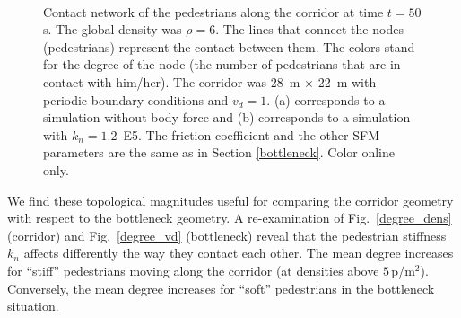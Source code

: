\documentclass[preprint,12pt]{elsarticle}
\begin{document}
\begin{figure}[!htbp]
\centering
    \ 
    \\
\caption[width=0.47\columnwidth]{Contact network of the pedestrians along the corridor at time $t=50\,$s. The global density was $\rho=6$.  The lines that connect the nodes (pedestrians) represent the contact between them. The colors stand for the degree of the node (the number of pedestrians that are in contact with him/her). The corridor was 28~m $\times$ 22~m with periodic boundary conditions and $v_d=1$. (a) corresponds to a simulation without body force and (b) corresponds to a simulation with $k_n=1.2$~E5. The friction coefficient and the other SFM parameters are the same as in Section \ref{bottleneck}. Color online only.}
\label{network_corridor}
\end{figure}

We find these topological magnitudes useful for comparing the 
corridor geometry with respect to the bottleneck geometry. A re-examination of 
Fig.~\ref{degree_dens} (corridor) and Fig.~\ref{degree_vd} (bottleneck) reveal 
that the pedestrian stiffness $k_n$ affects differently the way they contact 
each other. The mean degree increases for ``stiff'' pedestrians moving along 
the corridor (at densities above $5\,$p/m$^2$). Conversely, the mean degree 
increases for ``soft'' pedestrians in the bottleneck situation.\\  
\end{document}
